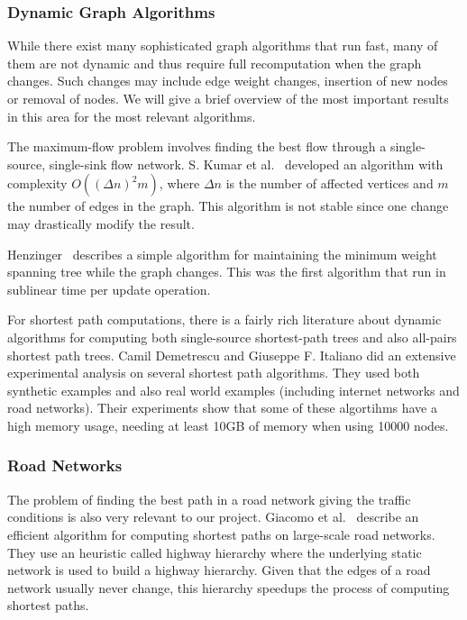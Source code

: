 \subsubsection{Dynamic Graph Algorithms}

While there exist many sophisticated graph algorithms that run fast, many of them are not dynamic and thus require full recomputation when the graph changes. Such changes may include edge weight changes, insertion of new nodes or removal of nodes. We will give a brief overview of the most important results in this area for the most relevant algorithms.

The maximum-flow problem involves finding the best flow through a single-source, single-sink flow network.
S. Kumar et al.~\cite{maxflow} developed an algorithm with complexity $O((\Delta n)^{2}m)$, where $\Delta n$ is the number of affected vertices and $m$ the number of edges in the graph. This algorithm is not stable since one change may drastically modify the result.

Henzinger~\cite{Henzinger97maintainingminimum} describes a simple algorithm for maintaining the minimum weight spanning tree while the graph changes. This was the first algorithm that run in sublinear time per update operation.

For shortest path computations, there is a fairly rich literature about dynamic algorithms for computing both single-source shortest-path trees and also all-pairs shortest path trees. Camil Demetrescu and Giuseppe F. Italiano did an extensive experimental analysis \cite{Demetrescu04experimentalanalysis} on several shortest path algorithms. They used both synthetic examples and also real world examples (including internet networks and road networks). Their experiments show that some of these algortihms have a high memory usage, needing at least 10GB of memory when using 10000 nodes.

\subsubsection{Road Networks}

The problem of finding the best path in a road network giving the traffic conditions is also very relevant to our project.
Giacomo et al.~\cite{DBLP:journals/corr/abs-0704-1068} describe an efficient algorithm for computing shortest paths on large-scale road networks. They use an heuristic called highway hierarchy where the underlying static network is used to build a highway hierarchy. Given that the edges of a road network usually never change, this hierarchy speedups the process of computing shortest paths.

